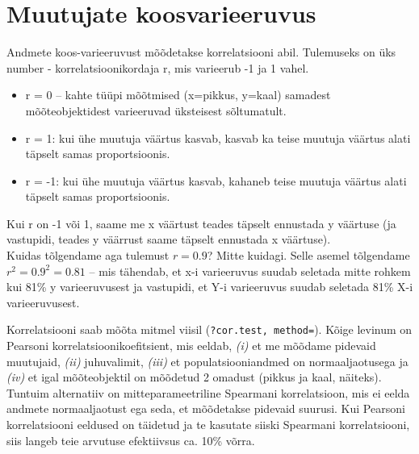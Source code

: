 \documentclass[]{book}
\newenvironment{Shaded}{\begin{snugshade}}{\end{snugshade}}
\newcommand{\KeywordTok}[1]{\textcolor[rgb]{0.13,0.29,0.53}{\textbf{#1}}}
\newcommand{\DataTypeTok}[1]{\textcolor[rgb]{0.13,0.29,0.53}{#1}}
\newcommand{\StringTok}[1]{\textcolor[rgb]{0.31,0.60,0.02}{#1}}
\newcommand{\CommentTok}[1]{\textcolor[rgb]{0.56,0.35,0.01}{\textit{#1}}}
\newcommand{\OperatorTok}[1]{\textcolor[rgb]{0.81,0.36,0.00}{\textbf{#1}}}
\newcommand{\NormalTok}[1]{#1}
\providecommand{\tightlist}{%
  \setlength{\itemsep}{0pt}\setlength{\parskip}{0pt}}
\begin{document}
\section*{Muutujate koosvarieeruvus}\label{muutujate-koosvarieeruvus}

Andmete koos-varieeruvust mõõdetakse korrelatsiooni abil. Tulemuseks on
üks number - korrelatsioonikordaja r, mis varieerub -1 ja 1 vahel.

\begin{itemize}
\tightlist
\item
  r = 0 -- kahte tüüpi mõõtmised (x=pikkus, y=kaal) samadest
  mõõteobjektidest varieeruvad üksteisest sõltumatult.
\item
  r = 1: kui ühe muutuja väärtus kasvab, kasvab ka teise muutuja väärtus
  alati täpselt samas proportsioonis.
\item
  r = -1: kui ühe muutuja väärtus kasvab, kahaneb teise muutuja väärtus
  alati täpselt samas proportsioonis.
\end{itemize}

Kui r on -1 või 1, saame me x väärtust teades täpselt ennustada y
väärtuse (ja vastupidi, teades y väärrust saame täpselt ennustada x
väärtuse).\\
Kuidas tõlgendame aga tulemust \(r = 0.9\)? Mitte kuidagi. Selle asemel
tõlgendame \(r^2 = 0.9^2 = 0.81\) -- mis tähendab, et x-i varieeruvus
suudab seletada mitte rohkem kui 81\% y varieeruvusest ja vastupidi, et
Y-i varieeruvus suudab seletada 81\% X-i varieeruvusest.

Korrelatsiooni saab mõõta mitmel viisil (\texttt{?cor.test,\ method=}).
Kõige levinum on Pearsoni korrelatsioonikoefitsient, mis eeldab,
\emph{(i)} et me mõõdame pidevaid muutujaid, \emph{(ii)} juhuvalimit,
\emph{(iii)} et populatsiooniandmed on normaaljaotusega ja \emph{(iv)}
et igal mõõteobjektil on mõõdetud 2 omadust (pikkus ja kaal, näiteks).
Tuntuim alternatiiv on mitteparameetriline Spearmani korrelatsioon, mis
ei eelda andmete normaaljaotust ega seda, et mõõdetakse pidevaid
suurusi. Kui Pearsoni korrelatsiooni eeldused on täidetud ja te kasutate
siiski Spearmani korrelatsiooni, siis langeb teie arvutuse efektiivsus
ca. 10\% võrra.

\begin{Shaded}
\end{Shaded}
\end{document}
